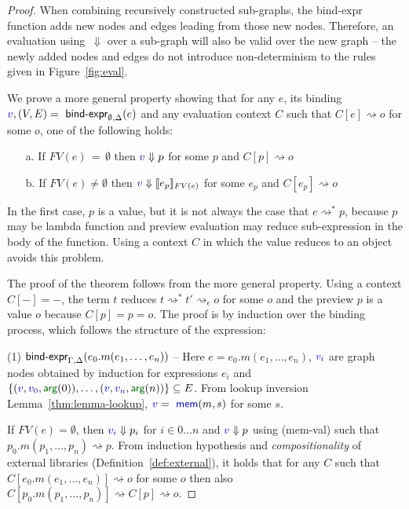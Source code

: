 \documentclass[english,crc]{programming}
\theoremstyle{plain}
\theoremstyle{definition}
\newcommand{\ident}[1]{\textnormal{\textcolor{idclr}{\sffamily #1}}}
\newcommand{\bndclr}[1]{\textcolor{kvdclr}{#1}}
\newcommand{\bnd}[1]{\textnormal{\textcolor{kvdclr}{\sffamily #1}}}
\newcommand{\blbl}[1]{\textnormal{\textcolor{numclr}{\sffamily #1}}}
\newcommand{\rname}[1]{{\sffamily(#1)}}
\begin{document}
\begin{proof}
When combining recursively constructed sub-graphs, the \ident{bind-expr} function
adds new nodes and edges leading from those new nodes. Therefore, an evaluation using~$\Downarrow$
over a sub-graph will also be valid over the new graph -- the newly added nodes and edges do not introduce
non-determinism to the rules given in Figure~\ref{fig:eval}.

We prove a more general property showing that for any $e$, its binding
$\bndclr{v}, (V, E) = \ident{bind-expr}_{\emptyset, \Delta}(e)$ and any evaluation context $C$
such that $C[e]\rightsquigarrow o$ for some $o$, one of the following holds:
%
\begin{enumerate}
\item[a.] If $FV(e)\,=\,\emptyset$ then $\bndclr{v} \Downarrow p$ for some $p$ and $C[p] \rightsquigarrow o$
\item[b.] If $FV(e)\neq\emptyset$ then $\bndclr{v} \Downarrow \llbracket e_p \rrbracket_{FV(e)}$ for some $e_p$ and $C[e_p] \rightsquigarrow o$
\end{enumerate}
%
In the first case, $p$ is a value, but it is not always the case that $e \rightsquigarrow^{*} p$,
because $p$ may be lambda function and preview evaluation may reduce sub-expression in the body of
the function. Using a context $C$ in which the value reduces to an object avoids this problem.

The proof of the theorem follows from the more general property. Using a context $C[-]=-$, the
term $t$ reduces $t \rightsquigarrow^{*}t' \rightsquigarrow_\epsilon o$ for some $o$ and the
preview $p$ is a value $o$ because $C[p] = p = o$.
The proof is by induction over the binding process, which follows the structure of the expression:

\vspace{0.75em}\noindent(1) $\ident{bind-expr}_{\Gamma, \Delta}(e_0.m(e_1, \ldots, e_n))$ --
  Here $e = e_0.m(e_1, \ldots, e_n)$, $\bndclr{v_i}$ are graph nodes obtained by induction for
  expressions $e_i$ and $\{ (\bndclr{v}, \bndclr{v_0}, \blbl{arg}(0)), \ldots, (\bndclr{v}, \bndclr{v_n}, \blbl{arg}(n))\} \subseteq E$.
  From lookup inversion Lemma~\ref{thm:lemma-lookup}, $\bndclr{v} = \bnd{mem}(m, s)$ for some $s$.

  If $FV(e)=\emptyset$, then $\bndclr{v_i} \Downarrow p_i$ for $i\in 0\ldots n$ and
  $\bndclr{v}\Downarrow p$ using \rname{mem-val} such that $p_0.m(p_1, \ldots, p_n) \rightsquigarrow p$.
  From induction hypothesis and \emph{compositionality} of external libraries (Definition~\ref{def:external}),
  it holds that for any $C$ such that $C[e_0.m(e_1, \ldots, e_n)] \rightsquigarrow o$ for some $o$
  then also $C[p_0.m(p_1, \ldots, p_n)] \rightsquigarrow C[p] \rightsquigarrow o$.


\end{proof}
\end{document}

